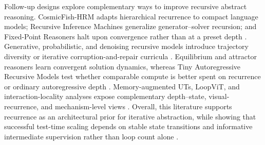 Follow-up designs explore complementary ways to improve recursive abstract reasoning. CosmicFish-HRM adapts hierarchical recurrence to compact language models; Recursive Inference Machines generalize generator--solver recursion; and Fixed-Point Reasoners halt upon convergence rather than at a preset depth \citep{lakkapragada2026cosmicfish,komisarczyk2026rim,movahedi2026fixedpoint}. Generative, probabilistic, and denoising recursive models introduce trajectory diversity or iterative corruption-and-repair curricula \citep{baek2026gram,sghaier2026ptrm,cameron2026denoisingrecursion}. Equilibrium and attractor reasoners learn convergent solution dynamics, whereas Tiny Autoregressive Recursive Models test whether comparable compute is better spent on recurrence or ordinary autoregressive depth \citep{feinashley2026attractor,rauba2026tarm}. Memory-augmented UTs, LoopViT, and interaction-locality analyses expose complementary depth--state, visual-recurrence, and mechanism-level views \citep{sapunov2026utm,shu2026loopvit}. Overall, this literature supports recurrence as an architectural prior for iterative abstraction, while showing that successful test-time scaling depends on stable state transitions and informative intermediate supervision rather than loop count alone \citep{chollet2026arcprize,vahdati2026arcprogress}.
